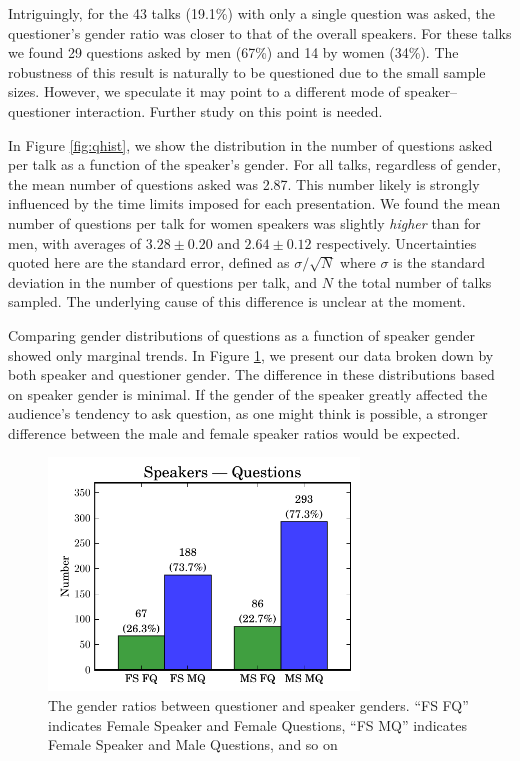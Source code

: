 \documentclass[iop]{emulateapj}
\begin{document}
Intriguingly, for the 43 talks (19.1\%) with only a single question was asked, the questioner's gender ratio was closer to that of the overall speakers. For these talks we found 29 questions asked by men (67\%) and 14 by women (34\%). The robustness of this result is naturally to be questioned due to the small sample sizes. However, we speculate it may point to a different mode of speaker--questioner interaction. Further study on this point is needed.



In Figure \ref{fig:qhist}, we show the distribution in the number of questions asked per talk as a function of the speaker's gender. For all talks, regardless of gender, the mean number of questions asked was 2.87. This number likely is strongly influenced by the time limits imposed for each presentation. We found the mean number of questions per talk for women speakers was slightly {\it higher} than for men, with averages of $3.28 \pm 0.20$ and $2.64\pm0.12$ respectively. Uncertainties quoted here are the standard error, defined as $\sigma/\sqrt{N}$ where $\sigma$ is the standard deviation in the number of questions per talk, and $N$ the total number of talks sampled. The underlying cause of this difference is unclear at the moment.


Comparing gender distributions of questions as a function of speaker gender showed only marginal trends. In Figure \ref{fig:sq}, we present our data broken down by both speaker and questioner gender. The difference in these distributions based on speaker gender is minimal.  If the gender of the speaker greatly affected the audience's tendency to ask question, as one might think is possible, a stronger difference between the male and female speaker ratios would be expected. 



\begin{figure}[!th]
\centering
\includegraphics[width=3.25in]{speakers_questions}
\caption{The gender ratios between questioner and speaker genders. ``FS FQ'' indicates Female Speaker and Female Questions, ``FS MQ'' indicates Female Speaker and Male Questions, and so on}
\label{fig:sq}
\end{figure}
\end{document}
